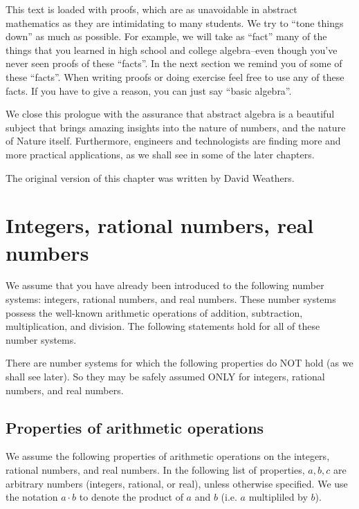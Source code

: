 This text is loaded with proofs, which are as unavoidable in abstract mathematics as they are intimidating to many students. We try to ``tone things down'' as much as possible. For example, we will take as ``fact'' many of the things that you learned in high school and  college algebra--even though you've never seen proofs of these ``facts''.  In the next section  we remind you of some of these ``facts''.  When writing proofs or doing exercise feel free to use any of these facts.  If you have to give a reason, you can just say  ``basic algebra''.

We close this prologue with the assurance that abstract algebra is a beautiful subject that brings amazing insights into the nature of numbers, and the nature of Nature itself. Furthermore, engineers and technologists are finding more and more practical applications, as we shall see in some of the later chapters.

The original version of this chapter was written by David Weathers. 

\section{Integers, rational numbers, real numbers}



We assume that you have already been introduced to the following number systems: integers, rational numbers, and real numbers.  These number systems possess the well-known arithmetic operations of addition, subtraction, multiplication, and division. The following statements hold for all of these number systems. 

\begin{warn}
There are number systems for which the following properties do NOT hold (as we shall see later). So they may be safely assumed ONLY for integers, rational numbers, and real numbers.
\end{warn}

\subsection{Properties of arithmetic operations}\label{OpsAndRels}

We assume the following properties of arithmetic operations on the integers, rational numbers, and real numbers. In the following list of properties, $a,b,c$ are arbitrary numbers (integers, rational, or real), unless otherwise specified. We use the notation $a \cdot b$ to denote the product of $a$ and $b$ (i.e. $a$ multipliled by $b$).

